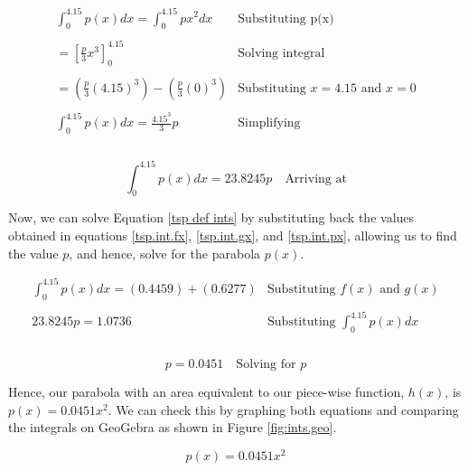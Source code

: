 \documentclass[12pt]{article}
\begin{document}
$$
\begin{array}{l|c}
   \int_{0}^{4.15}{p(x)}dx = \int_{0}^{4.15}{px^2}dx & \text{Substituting p(x)} \\ \\
    = \left[   \frac{p}{3}x^3   \right]_0^{4.15} & \text{Solving integral} \\ \\
    = (\frac{p}{3}(4.15)^3) - (\frac{p}{3}(0)^3) & \text{Substituting } x=4.15 \text{ and } x=0 \\ \\
    \int_{0}^{4.15}{p(x)}dx = \frac{4.15^3}{3}p & \text{Simplifying} \\ \\
 \end{array}
$$

\begin{equation}\label{tsp.int.px}
    \boxed{\int_{0}^{4.15}{p(x)}dx = 23.8245p}  \quad \text{Arriving at}
\end{equation}

Now, we can solve Equation \ref{tsp def ints} by substituting back the values obtained in equations \ref{tsp.int.fx}, \ref{tsp.int.gx}, and \ref{tsp.int.px}, allowing us to find the value $p$, and hence, solve for the parabola $p(x)$.

$$
\begin{array}{l|c}
    \int_{0}^{4.15}{p(x)}dx = (0.4459) +(0.6277) & \text{Substituting } f(x) \text{ and } g(x) \\ \\
    23.8245p = 1.0736 & \text{Substituting } \int_{0}^{4.15}{p(x)}dx \\ \\
 \end{array}
$$

\begin{equation}\label{tsp.int}
    \boxed{p = 0.0451}  \quad \text{Solving for } p
\end{equation}

Hence, our parabola with an area equivalent to our piece-wise function, $h(x)$, is $p(x)=0.0451x^2$. We can check this by graphing both equations and comparing the integrals on GeoGebra as shown in Figure \ref{fig:ints.geo}.

\vspace{-8mm}

\begin{equation}\label{p(x)}
    \boxed{p(x)=0.0451x^2}
\end{equation}
\end{document}
